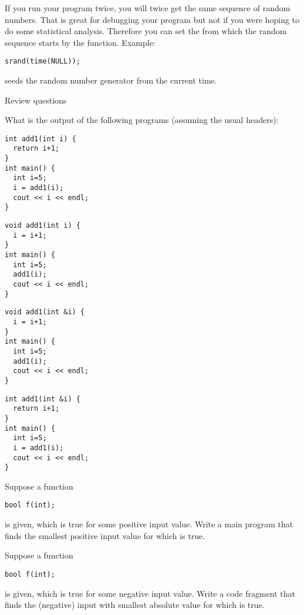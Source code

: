 If you run your program twice, you will twice get the same sequence of
random numbers. That is great for debugging your program but not if
you were hoping to do some statistical analysis. Therefore you can set
the  from which the random sequence
starts by the  function. Example:
\begin{lstlisting}
srand(time(NULL));
\end{lstlisting}
seeds the random number generator from the current time.

 {Review questions}

\begin{exercise}
  What is the output of the following programs (assuming the usual headers):

  \begin{multicols}{2}
\begin{lstlisting}
int add1(int i) {
  return i+1;
}
int main() {
  int i=5;
  i = add1(i);
  cout << i << endl;
}
\end{lstlisting}
\columnbreak
\begin{lstlisting}
void add1(int i) {
  i = i+1;
}
int main() {
  int i=5;
  add1(i);
  cout << i << endl;
}
\end{lstlisting}
  \end{multicols}

  \begin{multicols}{2}
\begin{lstlisting}
void add1(int &i) {
  i = i+1;
}
int main() {
  int i=5;
  add1(i);
  cout << i << endl;
}
\end{lstlisting}
\columnbreak
\begin{lstlisting}
int add1(int &i) {
  return i+1;
}
int main() {
  int i=5;
  i = add1(i);
  cout << i << endl;
}
\end{lstlisting}
  \end{multicols}
\end{exercise}

\begin{exercise}
  \label{ex:cpp-funcloop1}
  Suppose a function
\begin{lstlisting}
bool f(int);
\end{lstlisting}
is given, which is true for some positive input value. Write a main program that
finds the smallest positive input value for which  is true.
\end{exercise}

\begin{exercise}
  \label{ex:cpp-funcloop2}
  Suppose a function
\begin{lstlisting}
bool f(int);
\end{lstlisting}
is given, which is true for some negative input value. Write a code fragment that
finds the (negative) input with smallest absolute value for which  is true.
\end{exercise}

